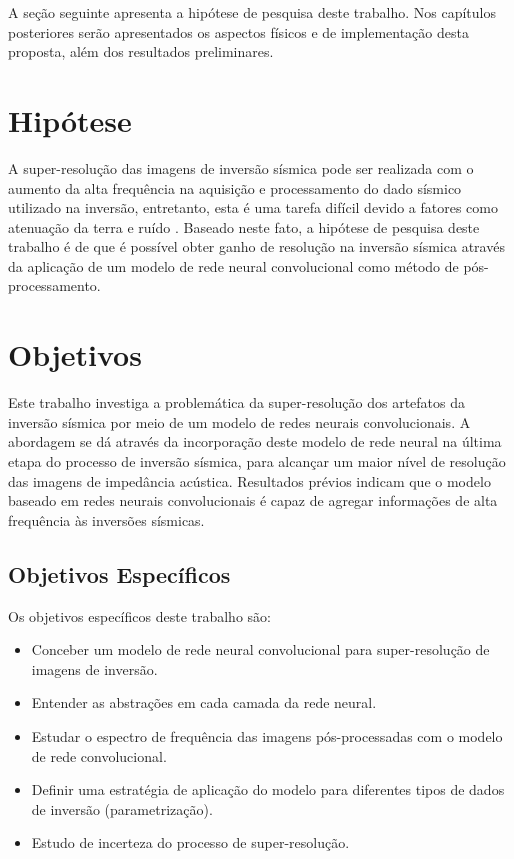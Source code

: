 A seção seguinte apresenta a hipótese de pesquisa deste trabalho. Nos capítulos posteriores
serão apresentados os aspectos físicos e de implementação desta proposta, além dos resultados preliminares.

\section{Hipótese}
A super-resolução das imagens de inversão sísmica pode ser realizada com o aumento da alta frequência na aquisição e
processamento do dado sísmico utilizado na inversão, entretanto, esta é uma tarefa difícil
devido a fatores como atenuação da terra e ruído \citep{Xiaoyu2012}.
Baseado neste fato, a hipótese de pesquisa deste trabalho é de que é possível obter ganho de resolução
na inversão sísmica através da aplicação de um modelo de rede neural convolucional como método de pós-processamento.

\section{Objetivos}

Este trabalho investiga a problemática da super-resolução dos artefatos da inversão sísmica
por meio de um modelo de redes neurais convolucionais.
A abordagem se dá através da incorporação deste modelo de rede neural na última
etapa do processo de inversão sísmica, para alcançar um maior nível de
resolução das imagens de impedância acústica.
Resultados prévios indicam que o modelo baseado em redes neurais convolucionais é capaz
de agregar informações de alta frequência às inversões sísmicas.

\subsection{Objetivos Específicos}
Os objetivos específicos deste trabalho são:
\begin{itemize}
 \item Conceber um modelo de rede neural convolucional para super-resolução de imagens de inversão.
 \item Entender as abstrações em cada camada da rede neural.
 \item Estudar o espectro de frequência das imagens pós-processadas com o modelo de rede convolucional.
 \item Definir uma estratégia de aplicação do modelo para diferentes tipos de dados de inversão (parametrização).
 \item Estudo de incerteza do processo de super-resolução.
\end{itemize}

